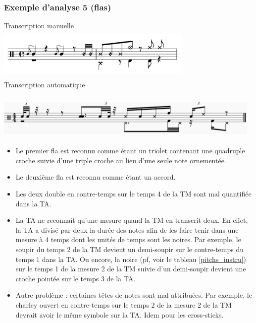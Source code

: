 \subsubsection{Exemple d’analyse 5 (flas)}
\label{flas}
Transcription manuelle\\
\includegraphics[height=25mm, width=95mm]{
z_images/4_experimentations/1_analyses/2_flas/0_124_funk_95_fill_4-4.png}\\
Transcription automatique\\\\
\includegraphics[height=20mm, width=130mm]{
z_images/4_experimentations/1_analyses/2_flas/1_124_funk_95_fill_4-4.png}\\

\begin{itemize}
	\item Le premier fla est reconnu comme étant un triolet contenant une
        quadruple croche suivie d’une triple croche au lieu d’une seule note
        ornementée.
	\item Le deuxième fla est reconnu comme étant un accord.
	\item Les deux double en contre-temps sur le temps 4 de la TM sont mal
        quantifiée dans la TA. 
	\item La TA ne reconnaît qu’une mesure quand la TM en transcrit deux. En
        effet, la TA a divisé par deux la durée des notes afin de les faire
        tenir dans une mesure à 4 temps dont les unités de temps sont les
        noires. Par exemple, le soupir du temps 2 de la TM devient un
        demi-soupir sur le contre-temps du temps 1 dans la TA. Ou encore, la
        noire (pf, voir le tableau \ref{pitchs_instru}) sur le temps 1 de la
        mesure 2 de la TM suivie d’un demi-soupir devient une croche pointée
        sur le temps 3 de la TA.
	\item Autre problème : certaines têtes de notes sont mal attribuées. Par
        exemple, le charley ouvert en contre-temps sur le temps 2 de la mesure
        2 de la TM devrait avoir le même symbole sur la TA. Idem pour les
        cross-sticks.
\end{itemize}

